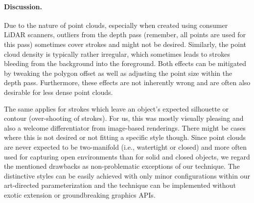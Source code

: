 \documentclass[a4paper,twoside]{article}
\newcommand{\ie}{i.e.,\xspace}
\begin{document}
\paragraph{Discussion.}
%
Due to the nature of point clouds, especially when created using consumer LiDAR scanners, outliers from the depth pass (remember, all points are used for this pass) sometimes cover strokes and might not be desired.
Similarly, the point cloud density is typically rather irregular, which sometimes leads to strokes bleeding from the background into the foreground.
Both effects can be mitigated by tweaking the polygon offset as well as adjusting the point size within the depth pass.
Furthermore, these effects are not inherently wrong and are often also desirable for less dense point clouds.

The same applies for strokes which leave an object's expected silhouette or contour (over-shooting of strokes).
For us, this was mostly visually pleasing and also a welcome differentiator from image-based renderings.
There might be cases where this is not desired or not fitting a specific style though.
Since point clouds are never expected to be two-manifold (\ie watertight or closed) and more often used for capturing open environments than for solid and closed objects, we regard the mentioned drawbacks as non-problematic exceptions of our technique.
The distinctive styles can be easily achieved with only minor configurations within our art-directed parameterization and the technique can be implemented without exotic extension or groundbreaking graphics APIs.
\end{document}
